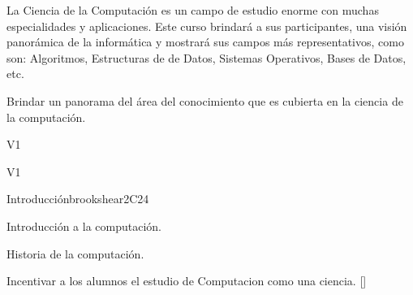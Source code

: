 \begin{syllabus}


\begin{justification}
La Ciencia de la Computación es un campo de estudio enorme con muchas especialidades y aplicaciones. Este curso brindará a sus participantes, una visión panorámica de la informática y mostrará sus campos más representativos, como son: Algoritmos, Estructuras de de Datos, Sistemas Operativos, Bases de Datos, etc.
\end{justification}

\begin{goals}
\item Brindar un panorama del área del conocimiento que es cubierta en la ciencia de la computación.
\end{goals}

\begin{outcomes}{V1}
    \item {}
    \item {}
    \item {}
    \item {}
    \item {}
\end{outcomes}

\begin{competences}{V1}
    \item {} 
    \item {} 
    \item {}
    \item {}
\end{competences}

\begin{unit}{}{Introducción}{brookshear}{2}{C24}
    \begin{topics}
	\item Introducción a la computación.
	\item Historia de la computación.
   \end{topics}
   \begin{learningoutcomes}
      \item Incentivar a los alumnos el estudio de Computacion como una ciencia. [\Familiarity]
   \end{learningoutcomes}
\end{unit}


\end{syllabus}
